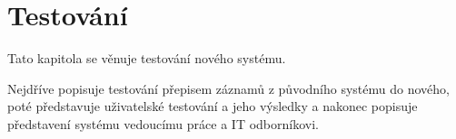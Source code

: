 \chapter{Testování}
Tato kapitola se věnuje testování nového systému. 

Nejdříve popisuje testování přepisem záznamů z původního systému do nového, poté představuje uživatelské testování a jeho výsledky a nakonec popisuje představení systému vedoucímu práce a IT odborníkovi.



